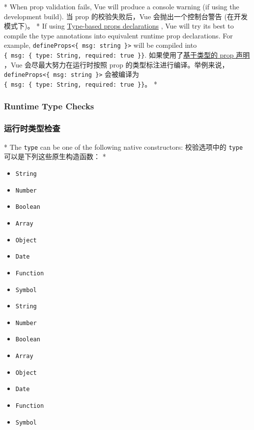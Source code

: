 \begin{paracol}{2}
\switchcolumn[0]*%
When prop validation fails, Vue will produce a console warning (if using
the development build).
\switchcolumn
当 prop 的校验失败后，Vue 会抛出一个控制台警告 (在开发模式下)。
\switchcolumn[0]*%
If using
\href{https://vuejs.org/api/sfc-script-setup.html\#type-only-props-emit-declarations}{Type-based
props declarations} , Vue will try its best to compile the type
annotations into equivalent runtime prop declarations. For example,
\texttt{defineProps\textless{}\{\ msg:\ string\ \}\textgreater{}} will
be compiled into
\texttt{\{\ msg:\ \{\ type:\ String,\ required:\ true\ \}\}}.
\switchcolumn
如果使用了\href{https://cn.vuejs.org/api/sfc-script-setup.html\#type-only-props-emit-declarations}{基于类型的
prop 声明} ，Vue 会尽最大努力在运行时按照 prop
的类型标注进行编译。举例来说，\texttt{defineProps\textless{}\{\ msg:\ string\ \}\textgreater{}}
会被编译为
\texttt{\{\ msg:\ \{\ type:\ String,\ required:\ true\ \}\}}。
\switchcolumn[0]*%
\subsubsection{Runtime Type Checks}
\switchcolumn
\subsubsection{运行时类型检查}


\switchcolumn[0]*%
The \texttt{type} can be one of the following native constructors:
\switchcolumn
校验选项中的 \texttt{type} 可以是下列这些原生构造函数：
\switchcolumn[0]*%
\begin{itemize}
\item
  \texttt{String}
\item
  \texttt{Number}
\item
  \texttt{Boolean}
\item
  \texttt{Array}
\item
  \texttt{Object}
\item
  \texttt{Date}
\item
  \texttt{Function}
\item
  \texttt{Symbol}
\end{itemize}
\switchcolumn
\begin{itemize}
\item
  \texttt{String}
\item
  \texttt{Number}
\item
  \texttt{Boolean}
\item
  \texttt{Array}
\item
  \texttt{Object}
\item
  \texttt{Date}
\item
  \texttt{Function}
\item
  \texttt{Symbol}
\end{itemize}



\end{paracol}
